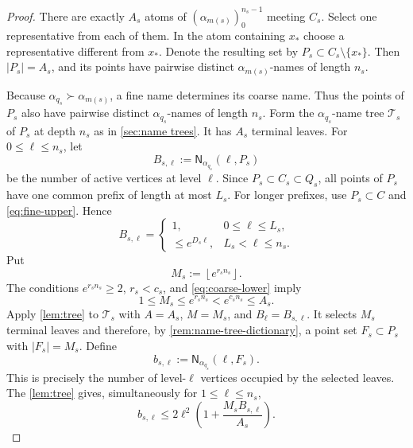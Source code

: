 \documentclass[12pt,letterpaper,reqno]{amsart}
\newcommand{\Nname}{\mathsf N}
\theoremstyle{definition}
\theoremstyle{remark}
\numberwithin{equation}{section}
\begin{document}
\begin{proof}
		There are exactly $A_s$ atoms of $(\alpha_{m(s)})_0^{n_s-1}$ meeting
		$C_s$.  Select one representative from each of them.  In the atom containing
		$x_*$ choose a representative different from $x_*$. 
	    Denote the resulting
		set by $P_s\subset C_s\setminus\{x_*\}$.  Then $|P_s|=A_s$, and its points
		have pairwise distinct $\alpha_{m(s)}$-names of length $n_s$.
		
		Because $\alpha_{q_s}\succ\alpha_{m(s)}$, a fine name determines its
		coarse name.  Thus the points of $P_s$ also have pairwise distinct
		$\alpha_{q_s}$-names of length $n_s$.  Form the $\alpha_{q_s}$-name tree
		$\mathcal T_s$ of $P_s$ at depth $n_s$ as in
		\cref{sec:name trees}.  It has $A_s$ terminal leaves.  For
		$0\leq\ell\leq n_s$, let
		\[
			B_{s,\ell}
			:=
			\Nname_{\alpha_{q_s}}(\ell,P_s)
		\]
		be the number of active vertices at level $\ell$.  Since
		$P_s\subset C_s\subset Q_s$, all points of $P_s$ have one common prefix of
		length at most $L_s$.  For longer prefixes, use $P_s\subset C$ and
		\eqref{eq:fine-upper}.  Hence
		\begin{equation}
			B_{s,\ell}=
			\begin{cases}
				1, & 0\leq\ell\leq L_s,\\
				\leq e^{D_s\ell}, & L_s<\ell\leq n_s.
			\end{cases}
			\label{eq:prefix-count}
		\end{equation}
		Put
		\begin{equation}
			M_s:=\left\lfloor e^{r_sn_s}\right\rfloor.
			\label{eq:Ms}
		\end{equation}
		The conditions $e^{r_sn_s}\geq2$, $r_s<c_s$, and
		\eqref{eq:coarse-lower} imply
		\[
			1\leq M_s\leq e^{r_sn_s}<e^{c_sn_s}\leq A_s.
		\]
		Apply \cref{lem:tree} to $\mathcal T_s$ with
		$A=A_s$, $M=M_s$, and $B_\ell=B_{s,\ell}$.  It selects $M_s$ terminal
		leaves and therefore, by \cref{rem:name-tree-dictionary}, a point set
		$F_s\subset P_s$ with $|F_s|=M_s$.  Define
		\[
			b_{s,\ell}
			:=
			\Nname_{\alpha_{q_s}}(\ell,F_s).
		\]
		This is precisely the number of level-$\ell$ vertices occupied by the
		selected leaves.  The \cref{lem:tree} gives, simultaneously for
		$1\leq\ell\leq n_s$,
		\begin{equation}
			b_{s,\ell}
			\leq
			2\ell^2\left(1+\frac{M_sB_{s,\ell}}{A_s}\right).
			\label{eq:stage-tree-bound}
		\end{equation}
		

\end{proof}
\end{document}
